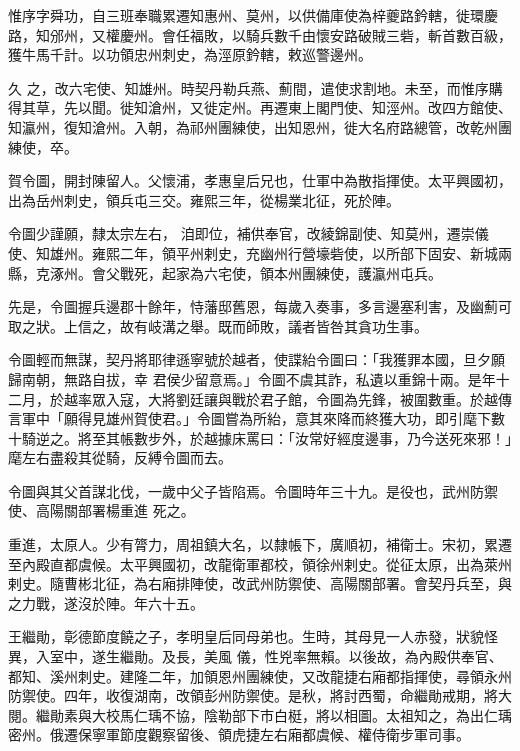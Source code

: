 \begin{pinyinscope}
 惟序字舜功，自三班奉職累遷知惠州、莫州，以供備庫使為梓夔路鈐轄，徙環慶路，知邠州，又權慶州。會任福敗，以騎兵數千由懷安路破賊三砦，斬首數百級，獲牛馬千計。以功領忠州刺史，為涇原鈐轄，敕巡警邊州。



 久
 之，改六宅使、知雄州。時契丹勒兵燕、薊間，遣使求割地。未至，而惟序購得其草，先以聞。徙知滄州，又徙定州。再遷東上閣門使、知涇州。改四方館使、知瀛州，復知滄州。入朝，為祁州團練使，出知恩州，徙大名府路總管，改乾州團練使，卒。



 賀令圖，開封陳留人。父懷浦，孝惠皇后兄也，仕軍中為散指揮使。太平興國初，出為岳州刺史，領兵屯三交。雍熙三年，從楊業北征，死於陣。



 令圖少謹願，隸太宗左右，
 洎即位，補供奉官，改綾錦副使、知莫州，遷崇儀使、知雄州。雍熙二年，領平州剌史，充幽州行營壕砦使，以所部下固安、新城兩縣，克涿州。會父戰死，起家為六宅使，領本州團練使，護瀛州屯兵。



 先是，令圖握兵邊郡十餘年，恃藩邸舊恩，每歲入奏事，多言邊塞利害，及幽薊可取之狀。上信之，故有岐溝之舉。既而師敗，議者皆咎其貪功生事。



 令圖輕而無謀，契丹將耶律遜寧號於越者，使諜紿令圖曰：「我獲罪本國，旦夕願歸南朝，無路自拔，幸
 君侯少留意焉。」令圖不虞其詐，私遺以重錦十兩。是年十二月，於越率眾入寇，大將劉廷讓與戰於君子館，令圖為先鋒，被圍數重。於越傳言軍中「願得見雄州賀使君。」令圖嘗為所紿，意其來降而終獲大功，即引麾下數十騎逆之。將至其帳數步外，於越據床罵曰：「汝常好經度邊事，乃今送死來邪！」麾左右盡殺其從騎，反縛令圖而去。



 令圖與其父首謀北伐，一歲中父子皆陷焉。令圖時年三十九。是役也，武州防禦使、高陽關部署楊重進
 死之。



 重進，太原人。少有膂力，周祖鎮大名，以隸帳下，廣順初，補衛士。宋初，累遷至內殿直都虞候。太平興國初，改龍衛軍都校，領徐州剌史。從征太原，出為萊州剌史。隨曹彬北征，為右廂排陣使，改武州防禦使、高陽關部署。會契丹兵至，與之力戰，遂沒於陣。年六十五。



 王繼勛，彰德節度饒之子，孝明皇后同母弟也。生時，其母見一人赤發，狀貌怪異，入室中，遂生繼勛。及長，美風
 儀，性兇率無賴。以後故，為內殿供奉官、都知、溪州刺史。建隆二年，加領恩州團練使，又改龍捷右廂都指揮使，尋領永州防禦使。四年，收復湖南，改領彭州防禦使。是秋，將討西蜀，命繼勛戒期，將大閱。繼勛素與大校馬仁瑀不協，陰勒部下市白梃，將以相圖。太祖知之，為出仁瑀密州。俄遷保寧軍節度觀察留後、領虎捷左右廂都虞候、權侍衛步軍司事。




\end{pinyinscope}
